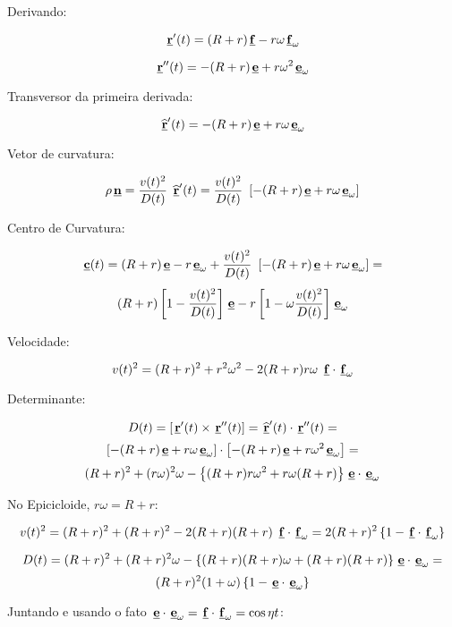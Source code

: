 Derivando:

\[
 \Vector{r}'(t)
 =
 (R+r) \Vector{f}-r \omega \Vector{f}_\omega 
\]

\[
 \Vector{r}''(t)
 =
 -(R+r) \Vector{e}+r \omega^2 \Vector{e}_\omega 
\]

Transversor da primeira derivada:

\[
 \Vector{\widehat{r}}'(t)
 =
 -(R+r) \Vector{e}+r \omega \Vector{e}_\omega 
\]



Vetor de curvatura:

\[
 \rho \Vector{n}
 =
  \frac 
 {
  v(t)^2
  }
  {
    D(t)
  }
  ~
  \Vector{\widehat{r} }'(t)
  =
  \frac 
 {
  v(t)^2
  }
  {
    D(t)
  }
  ~
  \left[ -(R+r) \Vector{e}+r \omega \Vector{e}_\omega \right]
\]


Centro de Curvatura:

\[
 \Vector{c}(t)
 =
  (R+r) \Vector{e}-r \Vector{e}_\omega
  +
 \frac{ v(t)^2 }{ D(t) }
  ~
  \left[ -(R+r) \Vector{e}+r \omega \Vector{e}_\omega \right]
  =
\]
\[
 (R+r) \left[ 1- \frac{ v(t)^2 }{ D(t) } \right] \Vector{e} 
 -
 r \left[  1- \omega \frac{ v(t)^2 }{ D(t) } \right]  \Vector{e} _\omega
\]

Velocidade:

\[
 v(t)^2
 =
 (R+r)^2+r^2 \omega^2 -2(R+r) r \omega ~\Vector{f} \cdot \Vector{f}_\omega
\]

Determinante:

\[
D(t)=
 \left[ \Vector{r}'(t) \times \Vector{r}''(t)\right]
  =
 \Vector{\widehat{r} }'(t) \cdot \Vector{r}''(t)
 =
 \]
 \[ 
 \left[ -(R+r) \Vector{e}+r \omega \Vector{e}_\omega   \right]
 \cdot
 \left[   -(R+r) \Vector{e}+r \omega^2 \Vector{e}_\omega \right]
 =
 \]
 \[
 (R+r)^2+(r \omega)^2 \omega
 -
 \left\{  (R+r) r \omega^2 + r \omega (R+r) \right\} \Vector{e} \cdot \Vector{e}_\omega
\]

No Epicicloide, $r \omega=R+r$:

\[
 v(t)^2
 =
 (R+r)^2+(R+r)^2 -2(R+r) (R+r) ~\Vector{f} \cdot \Vector{f}_\omega
 =
 2(R+r)^2 \left\{ 1-\Vector{f} \cdot \Vector{f}_\omega \right\}
\]

\[
 D(t)=
 (R+r)^2+(R+r)^2 \omega
 -
 \left\{  (R+r) (R+r) \omega + (R+r) (R+r) \right\} \Vector{e} \cdot \Vector{e}_\omega
 =
\]
\[
 (R+r)^2(1+\omega) \left\{ 1-\Vector{e} \cdot \Vector{e}_\omega \right\}
\]



Juntando e usando o fato $\Vector{e} \cdot \Vector{e}_\omega=\Vector{f} \cdot \Vector{f}_\omega=\cos{\eta t}$:

